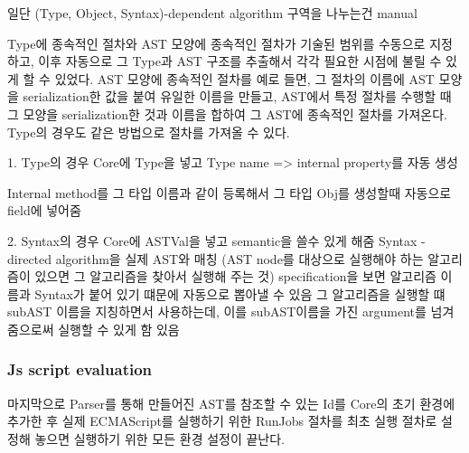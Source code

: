 일단 (Type, Object, Syntax)-dependent algorithm 구역을 나누는건 manual

Type에 종속적인 절차와 AST 모양에 종속적인 절차가 기술된 범위를 수동으로 지정하고, 이후 자동으로 그 Type과 AST 구조를 추출해서 각각 필요한 시점에 불릴 수 있게 할 수 있었다. AST 모양에 종속적인 절차를 예로 들면, 그 절차의 이름에 AST 모양을 serialization한 값을 붙여 유일한 이름을 만들고, AST에서 특정 절차를 수행할 때 그 모양을 serialization한 것과 이름을 합하여 그 AST에 종속적인 절차를 가져온다. Type의 경우도 같은 방법으로 절차를 가져올 수 있다.

1. Type의 경우 Core에 Type을 넣고 Type name => internal property를 자동 생성

Internal method를 그 타입 이름과 같이 등록해서 그 타입 Obj를 생성할때 자동으로 field에 넣어줌

2. Syntax의 경우 Core에 ASTVal을 넣고 semantic을 쓸수 있게 해줌
Syntax - directed algorithm을 실제 AST와 매칭 (AST node를 대상으로 실행해야 하는 알고리즘이 있으면 그 알고리즘을 찾아서 실행해 주는 것)
specification을 보면 알고리즘 이름과 Syntax가 붙어 있기 떄문에 자동으로 뽑아낼 수 있음
그 알고리즘을 실행할 떄 subAST 이름을 지칭하면서 사용하는데, 이를 subAST이름을 가진 argument를 넘겨줌으로써 실행할 수 있게 함
있음



\subsubsection{Js script evaluation}
 마지막으로 Parser를 통해 만들어진 AST를 참조할 수 있는 Id를 Core의 초기 환경에 추가한 후 실제 ECMAScript를 실행하기 위한 RunJobs 절차를 최초 실행 절차로 설정해 놓으면 실행하기 위한 모든 환경 설정이 끝난다.

